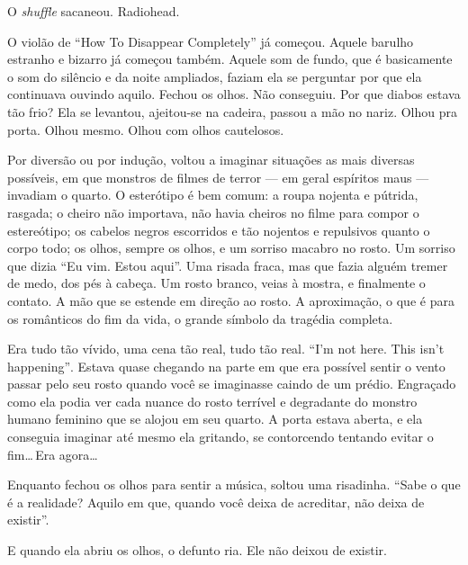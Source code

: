 O \emph{shuffle} sacaneou. Radiohead.

O violão de \foreignlanguage{english}{``How To Disappear Completely''} já começou. Aquele barulho estranho e bizarro já começou também. Aquele som de fundo, que é basicamente o som do silêncio e da noite ampliados, faziam ela se perguntar por que ela continuava ouvindo aquilo. Fechou os olhos. Não conseguiu. Por que diabos estava tão frio? Ela se levantou, ajeitou-se na cadeira, passou a mão no nariz. Olhou pra porta. Olhou mesmo. Olhou com olhos cautelosos.

Por diversão ou por indução, voltou a imaginar situações as mais diversas possíveis, em que monstros de filmes de terror --- em geral espíritos maus --- invadiam o quarto. O esterótipo é bem comum: a roupa nojenta e pútrida, rasgada; o cheiro não importava, não havia cheiros no filme para compor o estereótipo; os cabelos negros escorridos e tão nojentos e repulsivos quanto o corpo todo; os olhos, sempre os olhos, e um sorriso macabro no rosto. Um sorriso que dizia ``Eu vim. Estou aqui''. Uma risada fraca, mas que fazia alguém tremer de medo, dos pés à cabeça. Um rosto branco, veias à mostra, e finalmente o contato. A mão que se estende em direção ao rosto. A aproximação, o que é para os românticos do fim da vida, o grande símbolo da tragédia completa.

Era tudo tão vívido, uma cena tão real, tudo tão real. \foreignlanguage{english}{``I'm not here. This isn't happening''}. Estava quase chegando na parte em que era possível sentir o vento passar pelo seu rosto quando você se imaginasse caindo de um prédio. Engraçado como ela podia ver cada nuance do rosto terrível e degradante do monstro humano feminino que se alojou em seu quarto. A porta estava aberta, e ela conseguia imaginar até mesmo ela gritando, se contorcendo tentando evitar o fim\ldots\,Era agora\ldots

Enquanto fechou os olhos para sentir a música, soltou uma risadinha. ``Sabe o que é a realidade? Aquilo em que, quando você deixa de acreditar, não deixa de existir''.

E quando ela abriu os olhos, o defunto ria. Ele não deixou de existir.
